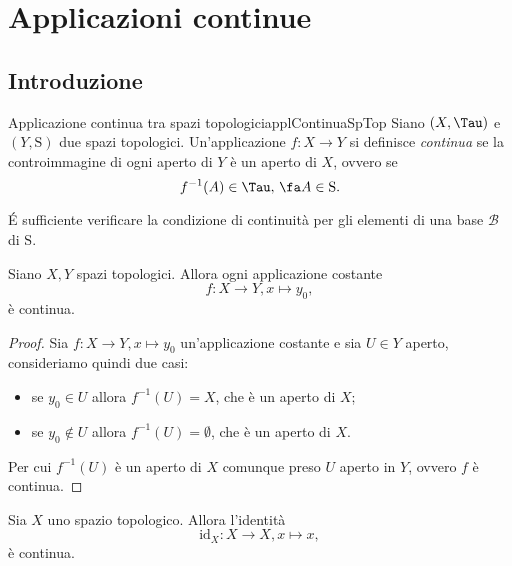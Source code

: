 %
%
\chapter{Applicazioni continue}
\section{Introduzione}

\begin{defn}{Applicazione continua tra spazi topologici}{applContinuaSpTop}
	Siano \((X,\Tau)\) e \((Y,\mathrm{S})\) due spazi topologici.
	Un'applicazione \(f\colon X\to Y\) si definisce \emph{continua} se la controimmagine di ogni aperto di \(Y\) è un aperto di \(X\), ovvero se
	\[
		f^{-1}(A)\in \Tau,\,\fa A\in\mathrm{S}.
	\]
\end{defn}

\begin{oss}
	\'E sufficiente verificare la condizione di continuità per gli elementi di una base \(\mathcal{B}\) di \(\mathrm{S}\).
\end{oss}

\begin{lem}\label{lm:cont1}
	Siano \(X,Y\) spazi topologici.
	Allora ogni applicazione costante
	\[
		f\colon X\to Y,x\mapsto y_0,
	\]
	è continua.
\end{lem}

\begin{proof}
	Sia \(f\colon X\to Y,x\mapsto y_0\) un'applicazione costante e sia \(U\in Y\) aperto, consideriamo quindi due casi:
	\begin{itemize}
		\item se \(y_0\in U\) allora \(f^{-1}(U)=X\), che è un aperto di \(X\);
		\item se \(y_0\notin U\) allora \(f^{-1}(U)=\emptyset\), che è un aperto di \(X\).
	\end{itemize}
	Per cui \(f^{-1}(U)\) è un aperto di \(X\) comunque preso \(U\) aperto in \(Y\), ovvero \(f\) è continua.
\end{proof}

\begin{lem}\label{lm:cont2}
	Sia \(X\) uno spazio topologico.
	Allora l'identità
	\[
		\mathrm{id}_X\colon X\to X,x\mapsto x,
	\]
	è continua.
\end{lem}

